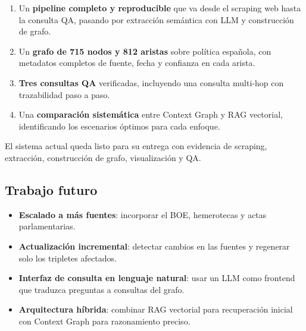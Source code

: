 \documentclass[12pt,a4paper]{article}
\begin{document}
\begin{enumerate}
  \item Un \textbf{pipeline completo y reproducible} que va desde el scraping web hasta la consulta QA, pasando por extracción semántica con LLM y construcción de grafo.
  \item Un \textbf{grafo de 715 nodos y 812 aristas} sobre política española, con metadatos completos de fuente, fecha y confianza en cada arista.
  \item \textbf{Tres consultas QA} verificadas, incluyendo una consulta multi-hop con trazabilidad paso a paso.
  \item Una \textbf{comparación sistemática} entre Context Graph y RAG vectorial, identificando los escenarios óptimos para cada enfoque.
\end{enumerate}

El sistema actual queda listo para su entrega con evidencia de scraping, extracción, construcción de grafo, visualización y QA.

\subsection*{Trabajo futuro}

\begin{itemize}
  \item \textbf{Escalado a más fuentes}: incorporar el BOE, hemerotecas y actas parlamentarias.
  \item \textbf{Actualización incremental}: detectar cambios en las fuentes y regenerar solo los tripletes afectados.
  \item \textbf{Interfaz de consulta en lenguaje natural}: usar un LLM como frontend que traduzca preguntas a consultas del grafo.
  \item \textbf{Arquitectura híbrida}: combinar RAG vectorial para recuperación inicial con Context Graph para razonamiento preciso.
\end{itemize}
\end{document}
